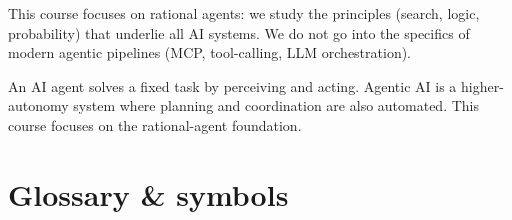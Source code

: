 \documentclass[a4paper,11pt]{article}
\begin{document}
This course focuses on rational agents: we study the principles
(search, logic, probability) that underlie all AI systems.
We do not go into the specifics of modern agentic pipelines
(MCP, tool-calling, LLM orchestration).

\begin{keytake}
An AI agent solves a fixed task by perceiving and acting.
Agentic AI is a higher-autonomy system where planning and coordination
are also automated. This course focuses on the rational-agent foundation.
\end{keytake}

\section*{Glossary \& symbols}
\end{document}

